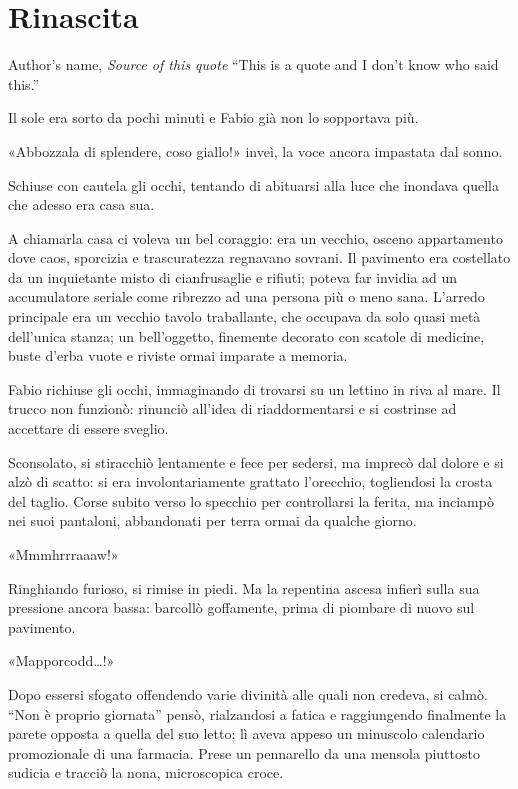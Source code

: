 \chapter{Rinascita}

\begin{chapquote}{Author's name, \textit{Source of this quote}}
``This is a quote and I don't know who said this.''
\end{chapquote}



Il sole era sorto da pochi minuti e Fabio già non lo sopportava più.

«Abbozzala  di splendere, coso giallo!» inveì, la voce ancora impastata dal sonno.

Schiuse con cautela gli occhi, tentando di abituarsi alla luce che inondava quella che adesso era casa sua.

A chiamarla casa ci voleva un bel coraggio: era un vecchio, osceno appartamento dove caos, sporcizia e trascuratezza regnavano sovrani. Il pavimento era costellato da un inquietante misto di cianfrusaglie e rifiuti; poteva far invidia ad un accumulatore seriale come ribrezzo ad una persona più o meno sana. L'arredo principale era un vecchio tavolo traballante, che occupava da solo quasi metà dell'unica stanza; un bell'oggetto, finemente decorato con scatole di medicine, buste d'erba vuote e riviste ormai imparate a memoria.

Fabio richiuse gli occhi, immaginando di trovarsi su un lettino in riva al mare. Il trucco non funzionò: rinunciò all'idea di riaddormentarsi e si costrinse ad accettare di essere sveglio.

Sconsolato, si stiracchiò lentamente e fece per sedersi, ma imprecò dal dolore e si alzò di scatto: si era involontariamente grattato l'orecchio, togliendosi la crosta del taglio. Corse subito verso lo specchio per controllarsi la ferita, ma inciampò nei suoi pantaloni, abbandonati per terra ormai da qualche giorno.

«Mmmhrrraaaw!»

Ringhiando furioso, si rimise in piedi. Ma la repentina ascesa infierì sulla sua pressione ancora bassa: barcollò goffamente, prima di piombare di nuovo sul pavimento.

«Mapporcodd\ldots!»

Dopo essersi sfogato offendendo varie divinità alle quali non credeva, si calmò. ``Non è proprio giornata'' pensò, rialzandosi a fatica e raggiungendo finalmente la parete opposta a quella del suo letto; lì aveva appeso un minuscolo calendario promozionale di una farmacia. Prese un pennarello da una mensola piuttosto sudicia e tracciò la nona, microscopica croce.

